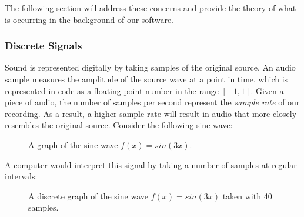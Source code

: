 \documentclass[12pt]{article}
\begin{document}
The following section will address these concerns and provide the theory of what is occurring in the background of our software.

\subsubsection{Discrete Signals}
Sound is represented digitally by taking samples of the original source. An audio sample measures the amplitude of the source wave at a point in time, which is represented in code as a floating point number in the range \([-1, 1]\). Given a piece of audio, the number of samples per second represent the \textit{sample rate} of our recording. As a result, a higher sample rate will result in audio that more closely resembles the original source. Consider the following sine wave:

\begin{figure}[h] %
\begin{center}
	\caption{A graph of the sine wave \(f(x) = sin(3x)\).}
\end{center}
\end{figure}

A computer would interpret this signal by taking a number of samples at regular intervals:

\begin{figure}[h] %
	\begin{center}
		\caption{A discrete graph of the sine wave \(f(x) = sin(3x)\) taken with 40 samples.}
	\end{center}
\end{figure}
\end{document}
